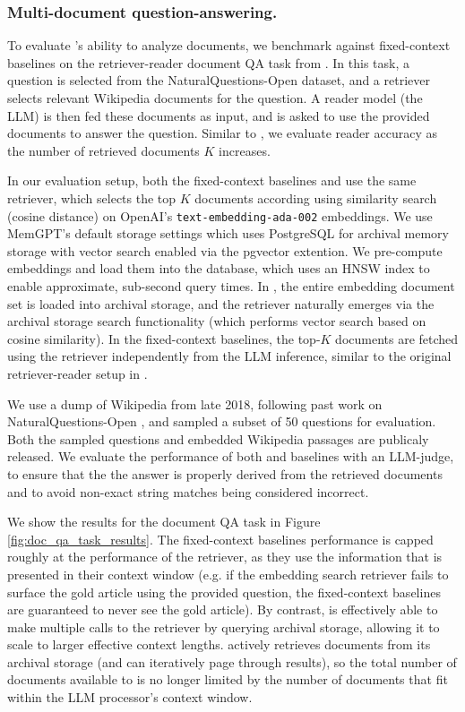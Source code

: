 \subsubsection{Multi-document question-answering.} 
To evaluate \ours's ability to analyze documents, we benchmark \ours against fixed-context baselines on the retriever-reader document QA task from \citet{liu2023lostinmiddle}. 
In this task, a question is selected from the NaturalQuestions-Open dataset, and a retriever selects relevant Wikipedia documents for the question. A reader model (the LLM) is then fed these documents as input, and is asked to use the provided documents to answer the question. 
Similar to \citet{liu2023lostinmiddle}, 
we evaluate reader accuracy as the number of retrieved documents $K$ increases.

In our evaluation setup, both the fixed-context baselines and \ours use the same retriever, which selects the top $K$ documents according using similarity search (cosine distance) on OpenAI's \texttt{text-embedding-ada-002} embeddings. We use MemGPT's default storage settings which uses PostgreSQL for archival memory storage with vector search enabled via the pgvector extention. We pre-compute embeddings and load them into the database, which uses an HNSW index to enable approximate, sub-second query times. 
In \ours, the entire embedding document set is loaded into archival storage, and the retriever naturally emerges via the archival storage search functionality (which performs vector search based on cosine similarity). 
In the fixed-context baselines, the top-$K$ documents are fetched using the retriever independently from the LLM inference, similar to the original retriever-reader setup in \citet{liu2023lostinmiddle}. 

We use a dump of Wikipedia from late 2018, following past work on NaturalQuestions-Open \citep{izacard2020leveraging, izacard2021unsupervised}, and sampled a subset of 50 questions for evaluation. Both the sampled questions and embedded Wikipedia passages are publicaly released. We evaluate the performance of both \ours and baselines with an LLM-judge, to ensure that the the answer is properly derived from the retrieved documents and to avoid non-exact string matches being considered incorrect. 


We show the results for the document QA task in Figure \ref{fig:doc_qa_task_results}. The fixed-context baselines performance is capped roughly at the performance of the retriever, as they use the information that is presented in their context window (e.g. if the embedding search retriever fails to surface the gold article using the provided question, the fixed-context baselines are guaranteed to never see the gold article). 
By contrast, \ours is effectively able to make multiple calls to the retriever by querying archival storage, allowing it to scale to larger effective context lengths. 
\ours actively retrieves documents from its archival storage (and can iteratively page through results), so the total number of documents available to \ours is no longer limited by the number of documents that fit within the LLM processor's context window.

